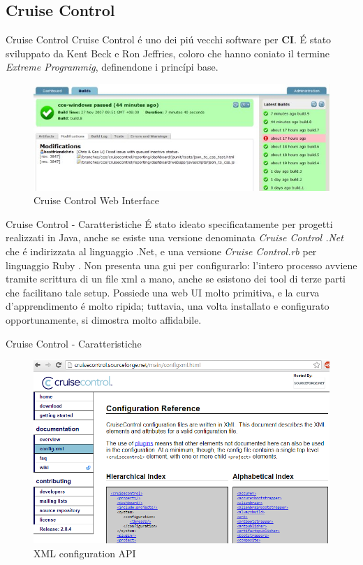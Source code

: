 \documentclass{beamer}
\begin{document}
\subsection{Cruise Control}
\begin{frame}{Cruise Control}
Cruise Control \'e uno dei pi\'u vecchi  software per \textbf{CI}. \'E stato sviluppato da Kent Beck e Ron Jeffries, coloro 
che hanno coniato il termine \emph{Extreme Programmig}, definendone i princ\'ipi base.
\begin{figure}
  \centering
  \includegraphics[scale=0.4]{images/cruise_control.jpg}
  \caption{Cruise Control Web Interface}
\end{figure}
\end{frame}


\begin{frame}{Cruise Control - Caratteristiche}
\'E stato ideato specificatamente per progetti realizzati in Java, anche se esiste una versione denominata \emph{Cruise Control
.Net} che \'e indirizzata al linguaggio .Net, e una versione \emph{Cruise Control.rb} per linguaggio Ruby . Non presenta una gui
per configurarlo: l'intero processo avviene tramite scrittura di un file xml a mano, anche se esistono dei tool di terze parti che
facilitano tale setup. Possiede una web UI molto primitiva, e la curva d'apprendimento \'e molto ripida; tuttavia, una volta
installato e configurato opportunamente, si dimostra molto affidabile.
\end{frame}


\begin{frame}{Cruise Control - Caratteristiche}
\begin{figure}
  \centering
  \includegraphics[scale=0.4]{images/cruise_control_cfg.jpg}
  \caption{XML configuration API}
\end{figure}
\end{frame}
\end{document}
